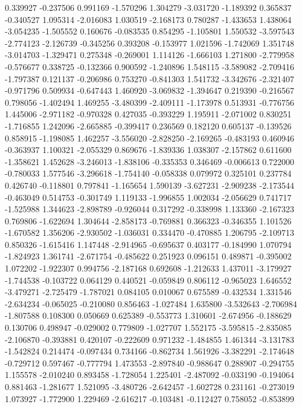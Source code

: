0.339927
-0.237506
0.991169
-1.570296
1.304279
-3.031720
-1.189392
0.365837
-0.340527
1.095314
-2.016083
1.030519
-2.168173
0.780287
-1.433653
1.438064
-3.054235
-1.505552
0.160676
-0.083535
0.854295
-1.105801
1.550532
-3.597543
-2.774123
-2.126739
-0.345256
0.393208
-0.153977
1.021596
-1.742069
1.351748
-3.014703
-1.329471
0.275348
-0.269001
1.114126
-1.666103
1.271800
-2.779958
-0.576677
0.338725
-0.132366
0.900592
-1.240896
1.548115
-3.589082
-2.709416
-1.797387
0.121137
-0.206986
0.753270
-0.841303
1.541732
-3.342676
-2.321407
-0.971796
0.509934
-0.647443
1.460920
-3.069832
-1.394647
0.219390
-0.216567
0.798056
-1.402494
1.469255
-3.480399
-2.409111
-1.173978
0.513931
-0.776756
1.445006
-2.971182
-0.970328
0.427035
-0.393229
1.195911
-2.071002
0.830251
-1.716855
1.242096
-2.665885
-0.399417
0.236569
0.182120
0.605137
-0.139526
0.858915
-1.198085
1.462257
-3.556020
-2.828250
-2.169265
-0.483193
0.460946
-0.363937
1.100321
-2.055329
0.869676
-1.839336
1.038307
-2.157862
0.611600
-1.358621
1.452628
-3.246013
-1.838106
-0.335353
0.346469
-0.006613
0.722000
-0.780033
1.577546
-3.296618
-1.754140
-0.058338
0.079972
0.325101
0.237784
0.426740
-0.118801
0.797841
-1.165654
1.590139
-3.627231
-2.909238
-2.173544
-0.463049
0.514753
-0.301749
1.119133
-1.996855
1.002034
-2.056629
0.741717
-1.525988
1.344623
-2.898789
-0.926044
0.317292
-0.338998
1.133360
-2.167323
0.769806
-1.622694
1.304644
-2.858173
-0.769881
0.366323
-0.346355
1.101526
-1.670582
1.356206
-2.930502
-1.036031
0.334470
-0.470885
1.206795
-2.109713
0.850326
-1.615416
1.147448
-2.914965
-0.695637
0.403177
-0.184990
1.070794
-1.824923
1.361741
-2.671754
-0.485622
0.251923
0.096151
0.489871
-0.395002
1.072202
-1.922307
0.994756
-2.187168
0.692608
-1.212633
1.437011
-3.179927
-1.744538
-0.103722
0.064129
0.440521
-0.059849
0.806112
-0.965023
1.646552
-3.479271
-2.725479
-1.787021
0.084105
0.010067
0.675589
-0.432534
1.331546
-2.634234
-0.065025
-0.210080
0.856463
-1.027484
1.635800
-3.532643
-2.706984
-1.807588
0.108300
0.050669
0.625389
-0.553773
1.310601
-2.674956
-0.188629
0.130706
0.498947
-0.029002
0.779809
-1.027707
1.552175
-3.595815
-2.835085
-2.106870
-0.393881
0.420107
-0.222609
0.971232
-1.484855
1.461344
-3.131783
-1.542824
0.214474
-0.097434
0.734166
-0.862734
1.561926
-3.382291
-2.174648
-0.729712
0.597467
-0.777794
1.473553
-2.897840
-0.988647
0.288907
-0.294755
1.155578
-2.010240
0.893458
-1.728054
1.225401
-2.487092
-0.033190
-0.194064
0.881463
-1.281677
1.521095
-3.480726
-2.642457
-1.602728
0.231161
-0.273019
1.073927
-1.772900
1.229469
-2.616217
-0.103481
-0.112427
0.758052
-0.853899
